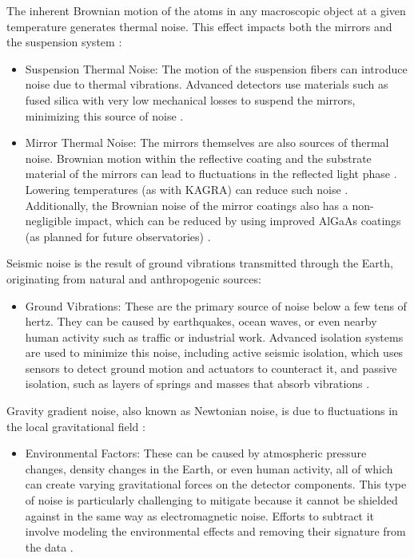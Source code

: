 The inherent Brownian motion of the atoms in any macroscopic object at a given temperature generates thermal noise. This effect impacts both the mirrors and the suspension system \cite{Levin:1997kv}:
\begin{itemize}
    \item Suspension Thermal Noise: The motion of the suspension fibers can introduce noise due to thermal vibrations. Advanced detectors use materials such as fused silica with very low mechanical losses to suspend the mirrors, minimizing this source of noise \cite{Aston:2012ona}.
    \item Mirror Thermal Noise: The mirrors themselves are also sources of thermal noise. Brownian motion within the reflective coating and the substrate material of the mirrors can lead to fluctuations in the reflected light phase \cite{Braginsky:2003yhs}. Lowering temperatures (as with KAGRA) can reduce such noise \cite{Steinlechner:2018crl}. Additionally, the Brownian noise of the mirror coatings also has a non-negligible impact, which can be reduced by using improved AlGaAs coatings (as planned for future observatories) \cite{Cole:2023sak}.  
\end{itemize}

Seismic noise is the result of ground vibrations transmitted through the Earth, originating from natural and anthropogenic sources: 
\begin{itemize}
    \item Ground Vibrations: These are the primary source of noise below a few tens of hertz. They can be caused by earthquakes, ocean waves, or even nearby human activity such as traffic or industrial work. Advanced isolation systems are used to minimize this noise, including active seismic isolation, which uses sensors to detect ground motion and actuators to counteract it, and passive isolation, such as layers of springs and masses that absorb vibrations \cite{Aston:2012ona,Daw:2004qd}.
\end{itemize}

Gravity gradient noise, also known as Newtonian noise, is due to fluctuations in the local gravitational field \cite{Harms:2015zma,Saulson:1984yg}:
\begin{itemize}
    \item  Environmental Factors: These can be caused by atmospheric pressure changes, density changes in the Earth, or even human activity, all of which can create varying gravitational forces on the detector components. This type of noise is particularly challenging to mitigate because it cannot be shielded against in the same way as electromagnetic noise. Efforts to subtract it involve modeling the environmental effects and removing their signature from the data \cite{Harms:2020uyc}.
\end{itemize}

